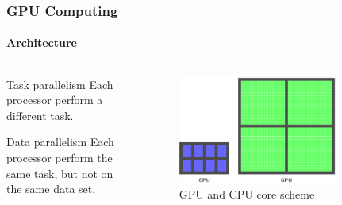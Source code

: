 \begin{frame}
    \frametitle{GPU Computing}
    \framesubtitle{Architecture}

    \begin{columns}
        \begin{column}{0.5\textwidth}
            \begin{block}{Task parallelism}
                Each processor perform a different task.
            \end{block}
            \begin{block}{Data parallelism}
                Each processor perform the same task, but not on the same data set.
            \end{block}
        \end{column}
        \begin{column}{0.5\textwidth}
             \begin{figure}
                 \centering
                 \includegraphics[width=0.8\textwidth]{img/cpu_gpu}
                 \caption{GPU and CPU core scheme}
                 \label{fig:titan}
             \end{figure}
        \end{column}
    \end{columns}
\end{frame}

